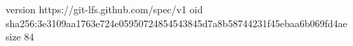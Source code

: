 version https://git-lfs.github.com/spec/v1
oid sha256:3e3109aa1763e724e05950724854543845d7a8b58744231f45ebaa6b069fd4ae
size 84
